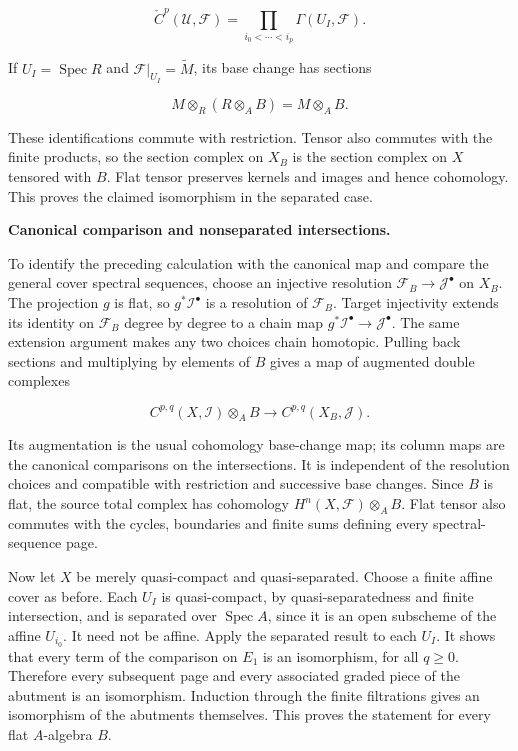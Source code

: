 \documentclass[11pt,a4paper,openany]{report}
\begin{document}
\[
\check C^p(\mathcal U,\mathcal F)=\prod_{i_0<\cdots<i_p}\Gamma(U_I,\mathcal F).
\]

If \(U_I=\operatorname{Spec}R\) and \(\mathcal F|_{U_I}=\widetilde M\), its base change has sections

\[
M\otimes_R(R\otimes_A B)=M\otimes_A B.
\]

These identifications commute with restriction. Tensor also commutes with the finite products, so the section complex on \(X_B\) is the section complex on \(X\) tensored with \(B\). Flat tensor preserves kernels and images and hence cohomology. This proves the claimed isomorphism in the separated case.

\textbf{Canonical comparison and nonseparated intersections.}

To identify the preceding calculation with the canonical map and compare the general cover spectral sequences, choose an injective resolution \(\mathcal F_B\to\mathcal J^\bullet\) on \(X_B\). The projection \(g\) is flat, so \(g^*\mathcal I^\bullet\) is a resolution of \(\mathcal F_B\). Target injectivity extends its identity on \(\mathcal F_B\) degree by degree to a chain map \(g^*\mathcal I^\bullet\to\mathcal J^\bullet\). The same extension argument makes any two choices chain homotopic. Pulling back sections and multiplying by elements of \(B\) gives a map of augmented double complexes

\[
C^{p,q}(X,\mathcal I)\otimes_A B
\longrightarrow C^{p,q}(X_B,\mathcal J).
\]

Its augmentation is the usual cohomology base-change map; its column maps are the canonical comparisons on the intersections. It is independent of the resolution choices and compatible with restriction and successive base changes. Since \(B\) is flat, the source total complex has cohomology \(H^n(X,\mathcal F)\otimes_A B\). Flat tensor also commutes with the cycles, boundaries and finite sums defining every spectral-sequence page.

Now let \(X\) be merely quasi-compact and quasi-separated. Choose a finite affine cover as before. Each \(U_I\) is quasi-compact, by quasi-separatedness and finite intersection, and is separated over \(\operatorname{Spec}A\), since it is an open subscheme of the affine \(U_{i_0}\). It need not be affine. Apply the separated result to each \(U_I\). It shows that every term of the comparison on \(E_1\) is an isomorphism, for all \(q\geq0\). Therefore every subsequent page and every associated graded piece of the abutment is an isomorphism. Induction through the finite filtrations gives an isomorphism of the abutments themselves. This proves the statement for every flat \(A\)-algebra \(B\).
\end{document}
